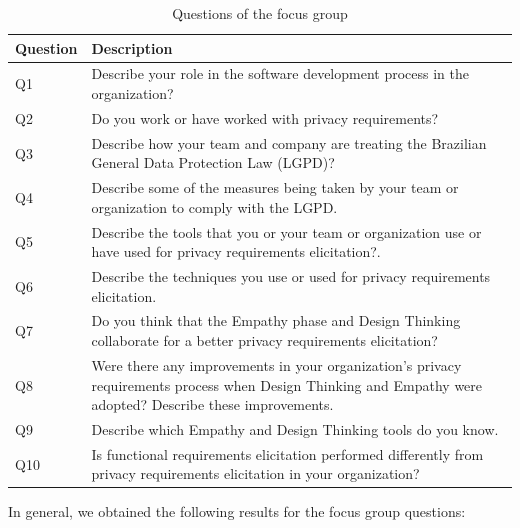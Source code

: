 \documentclass[conference]{IEEEtran}
\begin{document}
\begin{table}[htb!]
    \centering
    \begin{tabular}{|p{0.9cm}|p{7.0cm}|}
    \hline
     Question & Description   \\ \hline
     Q1 & Describe your role in the software development process in the organization? \\ \hline
     Q2 & Do you work or have worked with privacy requirements? \\ \hline
     Q3 & Describe how your team and company are treating the Brazilian General Data Protection Law (LGPD)? \\ \hline
     Q4 & Describe some of the measures being taken by your team or organization to comply with the LGPD. \\ \hline
     Q5 & Describe the tools that you or your team or organization use or have used for privacy requirements elicitation?.
    \\ \hline
    Q6 & Describe the techniques you use or used for privacy requirements elicitation.
    \\ \hline
    Q7 & Do you think that the Empathy phase and Design Thinking collaborate for a better privacy requirements elicitation?
    \\ \hline
    Q8 & Were there any improvements in your organization's privacy requirements process when Design Thinking and Empathy were adopted? Describe these improvements.
    \\ \hline
    Q9 & Describe which Empathy and Design Thinking tools do you know. \\ \hline
    Q10 &  Is functional requirements elicitation performed differently from privacy requirements elicitation in your organization?   \\ \hline
    \end{tabular}
    \caption{Questions of the focus group}
    \label{tab:group}
\end{table}


In general, we obtained the following results for the focus group questions:

\end{document}
